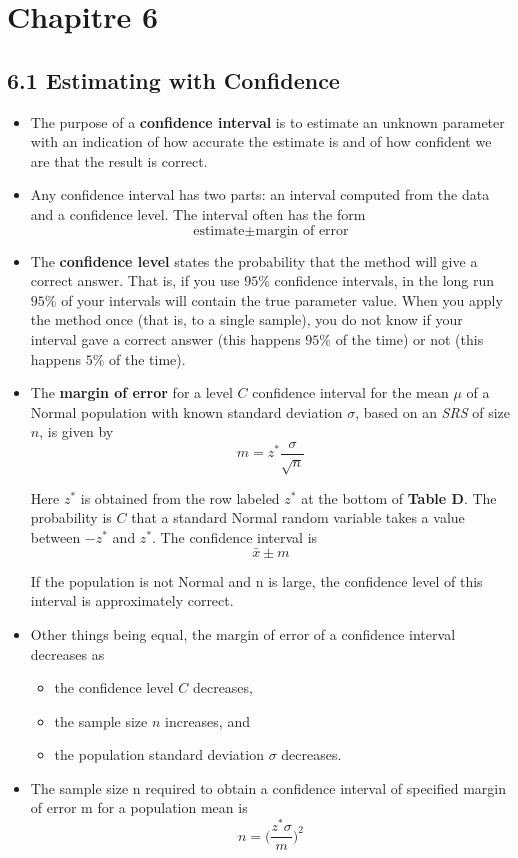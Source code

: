 \section{Chapitre 6}
	\subsection{6.1 Estimating with Confidence}
		\begin{itemize}
			\item The purpose of a \textbf{confidence interval} is to estimate an unknown parameter with an indication of how accurate the estimate is and of how confident we are that the result is correct.
			
			\item Any confidence interval has two parts: an interval computed from the data and a confidence level. The interval often has the form
				\[\text{estimate} \pm \text{margin of error}\]
			
			\item The \textbf{confidence level} states the probability that the method will give a correct answer. That is, if you use $95 \%$ confidence intervals, in the long run $95  \%$ of your intervals will contain the true parameter value. When you apply the method once (that is, to a single sample), you do not know if your interval gave a correct answer (this happens $95 \%$ of the time) or not (this happens $5 \%$ of the time).
					
			\item The \textbf{margin of error} for a level $C$ confidence interval for the mean $\mu$ of a Normal population with known standard deviation $\sigma$, based on an \textit{SRS} of size $n$, is given by \[m=z^{*}\frac{\sigma}{\sqrt{n}}\]
			
			Here $z^{*}$ is obtained from the row labeled $z^{*}$ at the bottom of \textbf{Table D}. The probability is $C$ that a standard Normal random variable takes a value between $-z^{*}$ and $z^{*}$. The confidence interval is \[\bar{x}\pm m\]
			
			If the population is not Normal and n is large, the confidence level of this interval is approximately correct.
			
			\item Other things being equal, the margin of error of a confidence interval decreases as
				\begin{itemize}
					\item the confidence level $C$ decreases,
					\item the sample size $n$ increases, and
					\item the population standard deviation $\sigma$ decreases.
				\end{itemize}
			\item The sample size n required to obtain a confidence interval of specified margin of error m for a population mean is \[n=\bigg(\frac{z^{*}\sigma}{m}\bigg)^2\]
			

\end{itemize}
